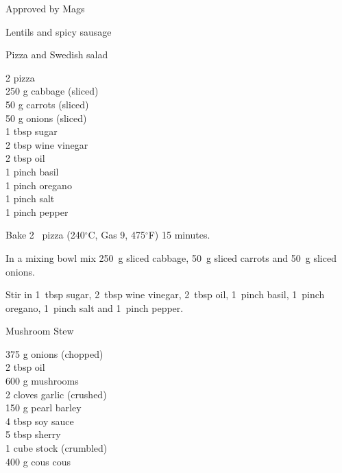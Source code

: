 \begin{menu}{Approved by Mags}
\begin{recipe}{2}{Lentils and spicy sausage}
\begin{instructions}
    \end{instructions}
    \end{recipe}%
  
    \begin{recipe}{1}{Pizza and Swedish salad}%
    
		\begin{ingredients}
		2  pizza  \\
	250 g cabbage (sliced) \\
	50 g carrots (sliced) \\
	50 g onions (sliced) \\
	1 tbsp sugar  \\
	2 tbsp wine vinegar  \\
	2 tbsp oil  \\
	1 pinch basil  \\
	1 pinch oregano  \\
	1 pinch salt  \\
	1 pinch pepper  \\
	
		\end{ingredients}
	
	
    \begin{instructions}
    \item 
        Bake 2~  pizza
      (240$^{\circ}$C, Gas 9, 475$^{\circ}$F)
     15 minutes.
      \item 
        In a mixing bowl mix
        250~g sliced cabbage,
        50~g sliced carrots
        and
        50~g sliced onions.
      \item 
        Stir in
        1~tbsp  sugar,
        2~tbsp  wine vinegar,
        2~tbsp  oil,
        1~pinch  basil,
        1~pinch  oregano,
        1~pinch  salt
        and
        1~pinch  pepper.
      
    \end{instructions}
    \end{recipe}%
  
    \begin{recipe}{2}{Mushroom Stew}%
    
		\begin{ingredients}
		375 g onions (chopped) \\
	2 tbsp oil  \\
	600 g mushrooms  \\
	2 cloves garlic (crushed) \\
	150 g pearl barley  \\
	4 tbsp soy sauce  \\
	5 tbsp sherry  \\
	1 cube stock (crumbled) \\
	400 g cous cous  \\
	

\end{ingredients}
\end{recipe}
\end{menu}
